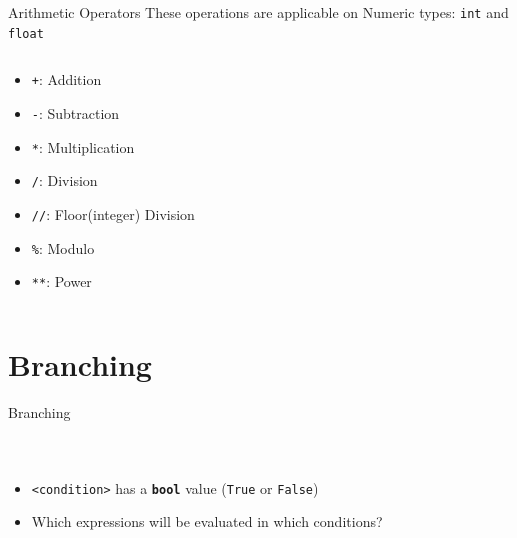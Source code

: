         \begin{frame}{Arithmetic Operators}
            \LARGE
            These operations are applicable on Numeric types: \texttt{int} and \texttt{float}
            \pause
            \begin{columns}
               \begin{column}{0.35\textwidth}
                \vspace{-5mm}
                \begin{itemize}
                    \item \texttt{+}: Addition
                    \pause
                    \item \texttt{-}: Subtraction
                    \pause
                    \item \texttt{*}: Multiplication
                    \pause
                    \item \texttt{/}: Division
                    \pause
                    \item \texttt{//}: Floor(integer) Division
                    \pause
                    \item \texttt{\%}: Modulo
                    \pause
                    \item \texttt{**}: Power 
                \end{itemize}
               \end{column}
               \pause
               \begin{column}{0.65\textwidth}
                \inputminted[frame=single,framesep=2pt]{python3}{code-examples/numeric_operators.py}
               \end{column} 
            \end{columns}
        \end{frame}



    \section{Branching}
        \begin{frame}{Branching}
            \vspace{-3mm}
            \begin{columns}
                \inputminted[firstline=1, lastline=4, frame=single,framesep=2pt]{python3}{code-examples/branching.py}
                \inputminted[firstline=6, lastline=13, frame=single,framesep=2pt]{python3}{code-examples/branching.py}
                \inputminted[firstline=15, lastline=27, frame=single,framesep=2pt]{python3}{code-examples/branching.py}
            \end{columns}
            \begin{itemize}
                \item \texttt{<condition>} has a \textbf{\texttt{bool}} value (\texttt{True} or \texttt{False})
                \item Which expressions will be evaluated in which conditions?
            \end{itemize}
        \end{frame}

